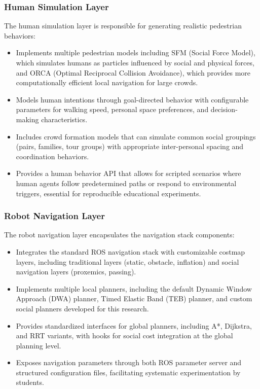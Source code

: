 \subsubsection{Human Simulation Layer}
The human simulation layer is responsible for generating realistic pedestrian behaviors:
\begin{itemize}
    \item Implements multiple pedestrian models including SFM (Social Force Model), which simulates humans 
    as particles influenced by social and physical forces, and ORCA (Optimal Reciprocal Collision Avoidance), 
    which provides more computationally efficient local navigation for large crowds.
    \item Models human intentions through goal-directed behavior with configurable parameters 
    for walking speed, personal space preferences, and decision-making characteristics.
    \item Includes crowd formation models that can simulate common social groupings (pairs, families, 
    tour groups) with appropriate inter-personal spacing and coordination behaviors.
    \item Provides a human behavior API that allows for scripted scenarios where human agents follow 
    predetermined paths or respond to environmental triggers, essential for reproducible educational 
    experiments.
\end{itemize}

\subsubsection{Robot Navigation Layer}
The robot navigation layer encapsulates the navigation stack components:
\begin{itemize}
    \item Integrates the standard ROS navigation stack with customizable costmap layers, 
    including traditional layers (static, obstacle, inflation) and social navigation 
    layers (proxemics, passing).
    \item Implements multiple local planners, including the default Dynamic Window 
    Approach (DWA) planner, Timed Elastic Band (TEB) planner, and custom social 
    planners developed for this research.
    \item Provides standardized interfaces for global planners, including A*, 
    Dijkstra, and RRT variants, with hooks for social cost integration at the 
    global planning level.
    \item Exposes navigation parameters through both ROS parameter server and structured 
    configuration files, facilitating systematic experimentation by students.
\end{itemize}

